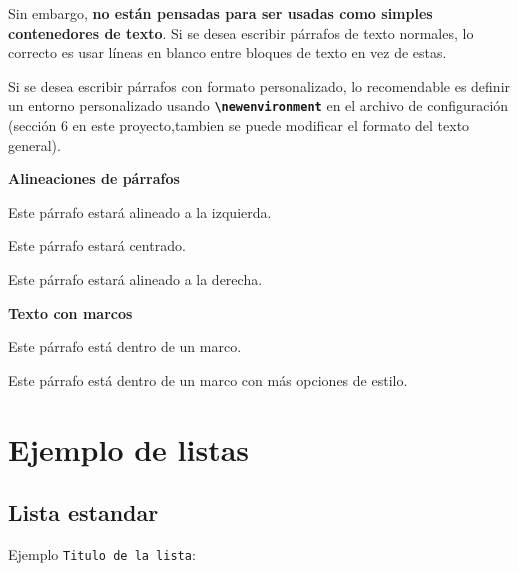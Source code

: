 Sin embargo, \textbf{no están pensadas para ser usadas como simples contenedores de texto}.  
Si se desea escribir párrafos de texto normales, lo correcto es usar líneas en blanco entre bloques de texto en vez de estas.

\begin{custompar}
  Si se desea escribir párrafos con formato personalizado, lo recomendable es definir un entorno personalizado usando 
  \textbf{\texttt{\textbackslash newenvironment}} en el archivo de configuración (sección 6 en este proyecto,tambien se puede modificar el formato del texto general).
  \end{custompar}

 
 \textbf{Alineaciones de párrafos}

 \begin{flushleft}
 Este párrafo estará alineado a la izquierda.
 \end{flushleft}
 
 \begin{center}
 Este párrafo estará centrado.
 \end{center}
 
 \begin{flushright}
 Este párrafo estará alineado a la derecha.
 \end{flushright}
 
 
\textbf{Texto con marcos}
 
 \begin{framed}
 Este párrafo está dentro de un marco.
 \end{framed}
 
 \begin{mdframed}
 Este párrafo está dentro de un marco con más opciones de estilo.
 \end{mdframed}
 
 \clearpage
 
 \section{Ejemplo de listas}
 
  \subsection{Lista estandar}
   Ejemplo \texttt{Titulo de la lista}:


